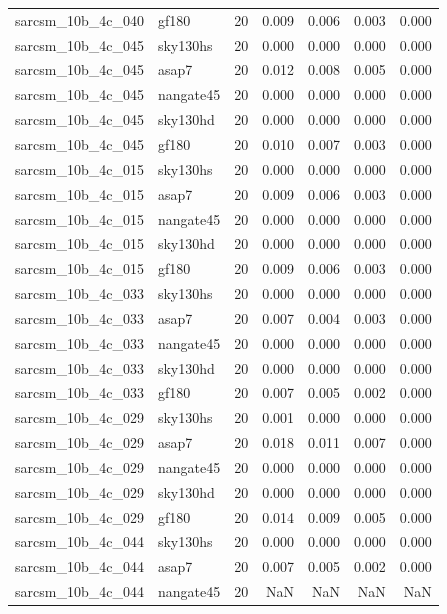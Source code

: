 \begin{tabular}{llrrrrr}
sarcsm\_10b\_4c\_040 & gf180 & 20 & 0.009 & 0.006 & 0.003 & 0.000 \\
sarcsm\_10b\_4c\_045 & sky130hs & 20 & 0.000 & 0.000 & 0.000 & 0.000 \\
sarcsm\_10b\_4c\_045 & asap7 & 20 & 0.012 & 0.008 & 0.005 & 0.000 \\
sarcsm\_10b\_4c\_045 & nangate45 & 20 & 0.000 & 0.000 & 0.000 & 0.000 \\
sarcsm\_10b\_4c\_045 & sky130hd & 20 & 0.000 & 0.000 & 0.000 & 0.000 \\
sarcsm\_10b\_4c\_045 & gf180 & 20 & 0.010 & 0.007 & 0.003 & 0.000 \\
sarcsm\_10b\_4c\_015 & sky130hs & 20 & 0.000 & 0.000 & 0.000 & 0.000 \\
sarcsm\_10b\_4c\_015 & asap7 & 20 & 0.009 & 0.006 & 0.003 & 0.000 \\
sarcsm\_10b\_4c\_015 & nangate45 & 20 & 0.000 & 0.000 & 0.000 & 0.000 \\
sarcsm\_10b\_4c\_015 & sky130hd & 20 & 0.000 & 0.000 & 0.000 & 0.000 \\
sarcsm\_10b\_4c\_015 & gf180 & 20 & 0.009 & 0.006 & 0.003 & 0.000 \\
sarcsm\_10b\_4c\_033 & sky130hs & 20 & 0.000 & 0.000 & 0.000 & 0.000 \\
sarcsm\_10b\_4c\_033 & asap7 & 20 & 0.007 & 0.004 & 0.003 & 0.000 \\
sarcsm\_10b\_4c\_033 & nangate45 & 20 & 0.000 & 0.000 & 0.000 & 0.000 \\
sarcsm\_10b\_4c\_033 & sky130hd & 20 & 0.000 & 0.000 & 0.000 & 0.000 \\
sarcsm\_10b\_4c\_033 & gf180 & 20 & 0.007 & 0.005 & 0.002 & 0.000 \\
sarcsm\_10b\_4c\_029 & sky130hs & 20 & 0.001 & 0.000 & 0.000 & 0.000 \\
sarcsm\_10b\_4c\_029 & asap7 & 20 & 0.018 & 0.011 & 0.007 & 0.000 \\
sarcsm\_10b\_4c\_029 & nangate45 & 20 & 0.000 & 0.000 & 0.000 & 0.000 \\
sarcsm\_10b\_4c\_029 & sky130hd & 20 & 0.000 & 0.000 & 0.000 & 0.000 \\
sarcsm\_10b\_4c\_029 & gf180 & 20 & 0.014 & 0.009 & 0.005 & 0.000 \\
sarcsm\_10b\_4c\_044 & sky130hs & 20 & 0.000 & 0.000 & 0.000 & 0.000 \\
sarcsm\_10b\_4c\_044 & asap7 & 20 & 0.007 & 0.005 & 0.002 & 0.000 \\
sarcsm\_10b\_4c\_044 & nangate45 & 20 & NaN & NaN & NaN & NaN \\

\end{tabular}
